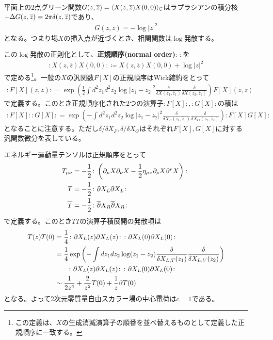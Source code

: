 平面上の2点グリーン関数$G(z,\overline{z})=\langle X(z,\overline{z})X(0,0)\rangle_{\mathbb{C}}$はラプラシアンの積分核$-\Delta G(z,\overline{z})=2\pi\delta(z,\overline{z})$であり、
\begin{align}
G(z,\overline{z})=-\log|z|^2
\end{align}
となる。つまり場$X$の挿入点が近づくとき、相関関数は$\log$発散する。

この$\log$発散の正則化として、\textbf{正規順序(normal order)}$\colon \ \colon $を
\begin{align}
\colon X(z,\overline{z})X(0,0)\colon \coloneqq X(z,\overline{z})X(0,0)+\log|z|^2
\end{align}
で定める\footnote{この定義は、$X$の生成消滅演算子の順番を並べ替えるものとして定義した正規順序に一致する。}。一般の$X$の汎関数$F[X]$の正規順序はWick縮約をとって
\begin{align}
\colon F[X](z,\overline{z})\colon =\exp\left(\frac{1}{2}\int d^2 z_1 d^2 z_2 \log|z_1-z_2|^2 \frac{\delta}{\delta X(z_1,\overline{z}_1)}\frac{\delta}{\delta X(z_2,\overline{z}_2)} \right)F[X](z,\overline{z})
\end{align}
で定義する。このとき正規順序化された2つの演算子$\colon F[X]\colon ,\colon G[X]\colon $の積は
\begin{align}
\colon F[X]\colon \colon G[X]\colon =\exp\left( -\int d^2 z_1 d^2 z_2 \log|z_1-z_2|^2 \frac{\delta}{\delta X_F(z_1,\overline{z}_1)}\frac{\delta}{\delta X_G(z_2,\overline{z}_2)} \right)\colon F[X]G[X]\colon 
\end{align}
となることに注意する。ただし$\delta/\delta X_F,\delta/\delta X_G$はそれぞれ$F[X],G[X]$に対する汎関数微分を表している。

エネルギー運動量テンソルは正規順序をとって
\begin{align}
T_{\mu\nu}&=-\frac{1}{2}\colon \left(\partial_{\mu}X\partial_{\nu}X-\frac{1}{2}\eta_{\mu\nu}\partial_{\rho}X\partial^{\rho}X\right)\colon \\
T&=-\frac{1}{2}\colon \partial X_L\partial X_L\colon \\
\overline{T}&=-\frac{1}{2}\colon \overline{\partial} X_R\overline{\partial} X_R\colon 
\end{align}
で定義する。このとき$TT$の演算子積展開の発散項は
\begin{align}
T(z)T(0)&=\frac{1}{4}\colon \partial X_L(z)\partial X_L(z)\colon \colon \partial X_L(0)\partial X_L(0)\colon \\
&=\frac{1}{4}\exp\left(-\int dz_1 dz_2 \log(z_1-z_2) \frac{\delta}{\delta X_{L,T}(z_1)}\frac{\delta}{\delta X_{L,V}(z_2)} \right)\notag\\
&\qquad \colon \partial X_L(z)\partial X_L(z)\colon \colon \partial X_L(0)\partial X_L(0)\colon \\
&\sim \frac{1}{2z^4}+\frac{2}{z^2}T(0)+\frac{1}{z}\partial T(0)
\end{align}
となる。よって2次元零質量自由スカラー場の中心電荷は$c=1$である。


